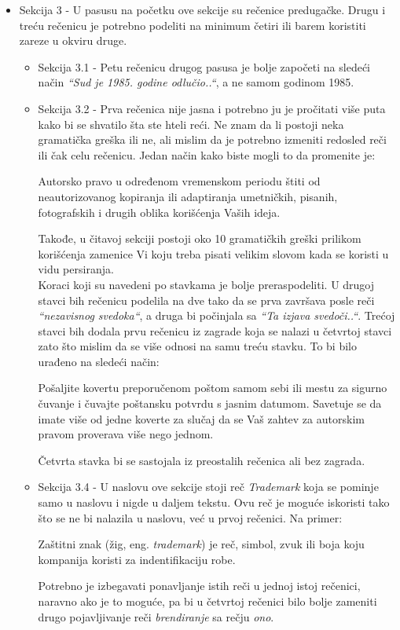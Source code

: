 \documentclass[a4paper]{report}
\begin{document}
\begin{itemize}
	\item Sekcija 3 - U pasusu na početku ove sekcije su rečenice predugačke. Drugu i treću rečenicu je potrebno podeliti na minimum četiri ili barem koristiti zareze u okviru druge.
		\begin{itemize}
			\item Sekcija 3.1 - Petu rečenicu drugog pasusa je bolje započeti na sledeći način \emph{``Sud je 1985. godine odlučio..``}, a ne samom godinom 1985.
			\item Sekcija 3.2 - Prva rečenica nije jasna i potrebno ju je pročitati više puta kako bi se shvatilo šta ste hteli reći. Ne znam da li postoji neka gramatička greška ili ne, ali mislim da je potrebno izmeniti redosled reči ili čak celu rečenicu. Jedan način kako biste mogli to da promenite je:
			\begin{displayquote}
			Autorsko pravo u određenom vremenskom periodu štiti od neautorizovanog kopiranja ili adaptiranja umetničkih, pisanih, fotografskih i drugih oblika korišćenja Vaših ideja.
			\end{displayquote}
			Takođe, u čitavoj sekciji postoji oko 10 gramatičkih greški prilikom korišćenja zamenice Vi koju treba pisati velikim slovom kada se koristi u vidu persiranja. \\
			Koraci koji su navedeni po stavkama je bolje preraspodeliti. U drugoj stavci bih rečenicu podelila na dve tako da se prva završava posle reči \emph{``nezavisnog svedoka``}, a druga bi počinjala sa \emph{``Ta izjava svedoči..``}. Trećoj stavci bih dodala prvu rečenicu iz zagrade koja se nalazi u četvrtoj stavci zato što mislim da se više odnosi na samu treću stavku. To bi bilo urađeno na sledeći način:
			\begin{displayquote}
			Pošaljite kovertu preporučenom poštom samom sebi ili mestu za sigurno čuvanje i čuvajte poštansku potvrdu s jasnim datumom. Savetuje se da imate više od jedne koverte za slučaj da se Vaš zahtev za autorskim pravom proverava više nego jednom.
			\end{displayquote}
			Četvrta stavka bi se sastojala iz preostalih rečenica ali bez zagrada.
			
			\item Sekcija 3.4 - U naslovu ove sekcije stoji reč \emph{Trademark} koja se pominje samo u naslovu i nigde u daljem tekstu. Ovu reč je moguće iskoristi tako što se ne bi nalazila u naslovu,
			 već u prvoj rečenici. Na primer:
			\begin{displayquote}
			Zaštitni znak (žig, eng. \emph{trademark}) je reč, simbol, zvuk ili boja koju kompanija koristi za indentifikaciju robe.
			\end{displayquote}
			Potrebno je izbegavati ponavljanje istih reči u jednoj istoj rečenici, naravno ako je to moguće, pa bi u četvrtoj rečenici bilo bolje zameniti drugo pojavljivanje reči \emph{brendiranje} sa rečju \emph{ono}.


\end{itemize}
\end{itemize}
\end{document}
